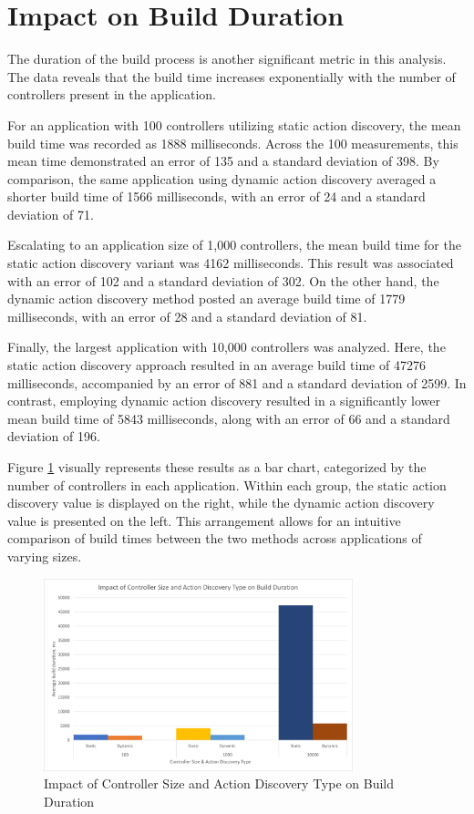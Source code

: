 \section{Impact on Build Duration}

The duration of the build process is another significant metric in this analysis. The data reveals that the build time increases exponentially with the number of controllers present in the application.

For an application with 100 controllers utilizing static action discovery, the mean build time was recorded as 1888 milliseconds. Across the 100 measurements, this mean time demonstrated an error of 135 and a standard deviation of 398. By comparison, the same application using dynamic action discovery averaged a shorter build time of 1566 milliseconds, with an error of 24 and a standard deviation of 71.

Escalating to an application size of 1,000 controllers, the mean build time for the static action discovery variant was 4162 milliseconds. This result was associated with an error of 102 and a standard deviation of 302. On the other hand, the dynamic action discovery method posted an average build time of 1779 milliseconds, with an error of 28 and a standard deviation of 81.

Finally, the largest application with 10,000 controllers was analyzed. Here, the static action discovery approach resulted in an average build time of 47276 milliseconds, accompanied by an error of 881 and a standard deviation of 2599. In contrast, employing dynamic action discovery resulted in a significantly lower mean build time of 5843 milliseconds, along with an error of 66 and a standard deviation of 196.

Figure \ref{fig:build-time-results} visually represents these results as a bar chart, categorized by the number of controllers in each application. Within each group, the static action discovery value is displayed on the right, while the dynamic action discovery value is presented on the left. This arrangement allows for an intuitive comparison of build times between the two methods across applications of varying sizes.

\begin{figure}[H]
\centering
\includegraphics[width=0.8\textwidth]{graphics/Impact of Controller Size and Action Discovery Type on Build Duration.png}
\caption{Impact of Controller Size and Action Discovery Type on Build Duration}
\label{fig:build-time-results}
\end{figure}

